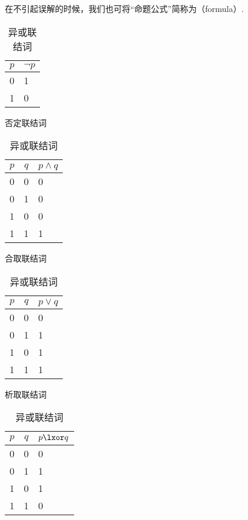 在不引起误解的时候，我们也可将“命题公式”简称为（formula）.

\begin{table}[htb]
	\centering
	\begin{subtable}[ht]{0.9\textwidth}
		\centering
		\begin{tabular}{|c|p{1.5cm}|}
			\hline
			\(p\) & \(\neg p\) \\ \hline
			0 & 1 \\ \hline
			1 & 0 \\ \hline
		\end{tabular}
		\caption{否定联结词}
	\end{subtable}

	\begin{subtable}[ht]{0.25\textwidth}
		\centering
		\begin{tabular}{|*{2}{c|}p{2cm}|}
			\hline
			\(p\) & \(q\) & \(p \land q\) \\ \hline
			0 & 0 & 0 \\ \hline
			0 & 1 & 0 \\ \hline
			1 & 0 & 0 \\ \hline
			1 & 1 & 1 \\ \hline
		\end{tabular}
		\caption{合取联结词}
	\end{subtable}
	\begin{subtable}[ht]{0.3\textwidth}
		\centering
		\begin{tabular}{|*{2}{c|}p{2cm}|}
			\hline
			\(p\) & \(q\) & \(p \lor q\) \\ \hline
			0 & 0 & 0 \\ \hline
			0 & 1 & 1 \\ \hline
			1 & 0 & 1 \\ \hline
			1 & 1 & 1 \\ \hline
		\end{tabular}
		\caption{析取联结词}
	\end{subtable}
	\begin{subtable}[ht]{0.3\textwidth}
		\centering
		\begin{tabular}{|*{2}{c|}p{2cm}|}
			\hline
			\(p\) & \(q\) & \(p \lxor q\) \\ \hline
			0 & 0 & 0 \\ \hline
			0 & 1 & 1 \\ \hline
			1 & 0 & 1 \\ \hline
			1 & 1 & 0 \\ \hline
		\end{tabular}
		\caption{异或联结词}
	\end{subtable}


\end{table}
